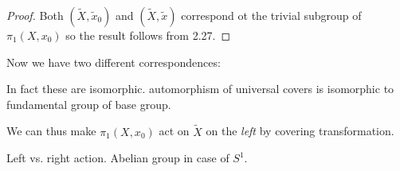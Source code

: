 \documentclass[a4paper]{article}
\begin{document}
\begin{proof}
  Both \((\tilde X, \tilde x_0)\) and \((\tilde X, \tilde x)\) correspond ot the trivial subgroup of \(\pi_1(X, x_0)\) so the result follows from 2.27.
\end{proof}

Now we have two different correspondences:

\blindtext

In fact these are isomorphic. automorphism of universal covers is isomorphic to fundamental group of base group.

We can thus make \(\pi_1(X, x_0)\) act on \(\tilde X\) on the \emph{left} by covering transformation.
\begin{remark}
  Left vs. right action. Abelian group in case of \(S^1\).
\end{remark}

































\printindex
\end{document}
